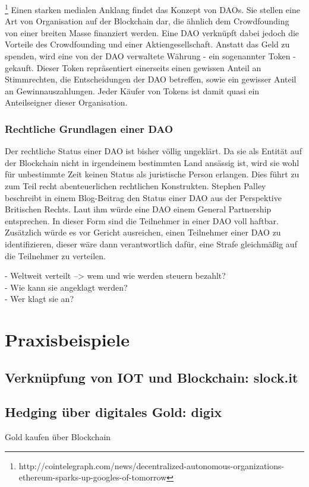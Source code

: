 \footnote{http://cointelegraph.com/news/decentralized-autonomous-organizations-ethereum-sparks-up-googles-of-tomorrow} Einen starken medialen Anklang findet das Konzept von \ac{DAO}s. Sie stellen eine Art von Organisation auf der Blockchain dar, die ähnlich dem Crowdfounding von einer breiten Masse finanziert werden. Eine DAO verknüpft dabei jedoch die Vorteile des Crowdfounding und einer Aktiengesellschaft. Anstatt das Geld zu spenden, wird eine von der DAO verwaltete Währung - ein sogenannter Token - gekauft. Dieser Token repräsentiert einerseits einen gewissen Anteil an Stimmrechten, die Entscheidungen der DAO betreffen, sowie ein gewisser Anteil an Gewinnauszahlungen. Jeder Käufer von Tokens ist damit quasi ein Anteilseigner dieser Organisation.\\

\subsubsection{Rechtliche Grundlagen einer DAO}
Der rechtliche Status einer DAO ist bisher völlig ungeklärt. Da sie als Entität auf der Blockchain nicht in irgendeinem bestimmten Land ansässig ist, wird sie wohl für unbestimmte Zeit keinen Status als juristische Person erlangen. Dies führt zu zum Teil recht abenteuerlichen rechtlichen Konstrukten. Stephen Palley beschreibt in einem Blog-Beitrag den Status einer DAO aus der Perspektive Britischen Rechts. Laut ihm würde eine DAO einem \glqq General Partnership\grqq{} entsprechen. In dieser Form sind die Teilnehmer in einer DAO voll haftbar. Zusätzlich würde es vor Gericht ausreichen, einen Teilnehmer einer DAO zu identifizieren, dieser wäre dann verantwortlich dafür, eine Strafe gleichmäßig auf die Teilnehmer zu verteilen.

- Weltweit verteilt --> wem und wie werden steuern bezahlt?\\
- Wie kann sie angeklagt werden?\\
- Wer klagt sie an?\\

\section{Praxisbeispiele}
\subsection{Verknüpfung von IOT und Blockchain: slock.it}
\subsection{Hedging über digitales Gold: digix}
Gold kaufen über Blockchain

